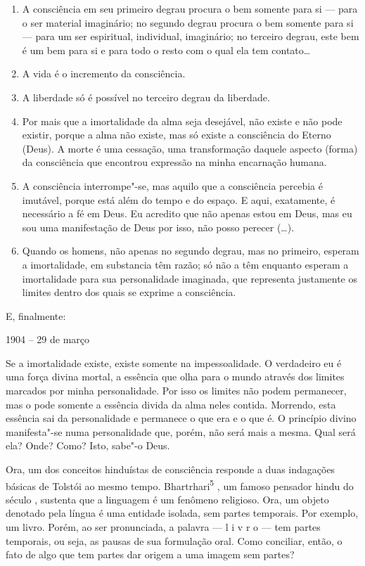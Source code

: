 \begin{enumerate}
\def\labelenumi{\arabic{enumi})}
\item
  A consciência em seu primeiro degrau procura o bem somente para si ---
  para o ser material imaginário; no segundo degrau procura o bem
  somente para si --- para um ser espiritual, individual, imaginário; no
  terceiro degrau, este bem é um bem para si e para todo o resto com o
  qual ela tem contato\ldots{}
\item
  A vida é o incremento da consciência.
\item
  A liberdade só é possível no terceiro degrau da liberdade.
\item
  Por mais que a imortalidade da alma seja desejável, não existe e não
  pode existir, porque a alma não existe, mas só existe a consciência do
  Eterno (Deus). A morte é uma cessação, uma transformação daquele
  aspecto (forma) da consciência que encontrou expressão na minha
  encarnação humana.
\item
  A consciência interrompe"-se, mas aquilo que a consciência percebia é
  imutável, porque está além do tempo e do espaço. E aqui, exatamente, é
  necessário a fé em Deus. Eu acredito que não apenas estou em Deus, mas
  eu sou uma manifestação de Deus por isso, não posso perecer (\ldots{}).
\item
  Quando os homens, não apenas no segundo degrau, mas no primeiro,
  esperam a imortalidade, em substancia têm razão; só não a têm enquanto
  esperam a imortalidade para sua personalidade imaginada, que
  representa justamente os limites dentro dos quais se exprime a
  consciência.
\end{enumerate}

E, finalmente:

1904 -- 29 de março

Se a imortalidade existe, existe somente na impessoalidade. O verdadeiro
eu é uma força divina mortal, a essência que olha para o mundo através
dos limites marcados por minha personalidade. Por isso os limites não
podem permanecer, mas o pode somente a essência divida da alma neles
contida. Morrendo, esta essência sai da personalidade e permanece o que
era e o que é. O princípio divino manifesta"-se numa personalidade que,
porém, não será mais a mesma. Qual será ela? Onde? Como? Isto, sabe"-o
Deus.

Ora, um dos conceitos hinduístas de consciência responde a duas
indagações básicas de Tolstói ao mesmo tempo.
Bhartrhari\textsuperscript{5} , um famoso pensador hindu do século ,
sustenta que a linguagem é um fenômeno religioso. Ora, um objeto
denotado pela língua é uma entidade isolada, sem partes temporais. Por
exemplo, um livro. Porém, ao ser pronunciada, a palavra --- l i v r o
--- tem partes temporais, ou seja, as pausas de sua formulação oral.
Como conciliar, então, o fato de algo que tem partes dar origem a uma
imagem sem partes?


